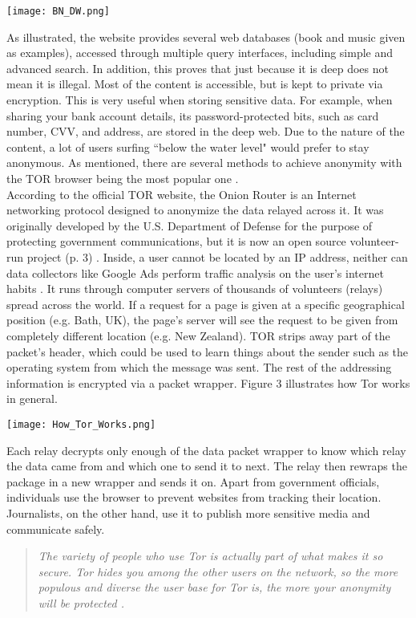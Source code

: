 \documentclass[a4paper, 12pt, titlepage]{article}
\begin{document}
\begin{center}
\texttt{[image: BN\_DW.png]}
\label{fig:BN}
\end{center}
As illustrated, the website provides several web databases (book and music given as examples), accessed through multiple query interfaces, including simple and advanced search. In addition, this proves that just because it is deep does not mean it is illegal. Most of the content is accessible, but is kept to private via encryption. This is very useful when storing sensitive data. For example, when sharing your bank account details, its password-protected bits, such as card number, CVV, and address, are stored in the deep web. Due to the nature of the content, a lot of users surfing ``below the water level" would prefer to stay anonymous. As mentioned, there are several methods to achieve anonymity with the TOR browser being the most popular one \cite{TheTORProject}. \\[6pt]
According to the official TOR website, the Onion Router is an Internet networking protocol designed to anonymize the data relayed across it. It was originally developed by the U.S. Department of Defense for the purpose of protecting government communications, but it is now an open source volunteer-run project (p. 3) \cite{InsideDW}. Inside, a user cannot be located by an IP address, neither can data collectors like Google Ads perform traffic analysis on the user's internet habits \cite{MGtoDW}. It runs through computer servers of thousands of volunteers (relays) spread across the world. If a request for a page is given at a specific geographical position (e.g. Bath, UK), the page's server will see the request to be given from completely different location (e.g. New Zealand). TOR strips away part of the packet's header, which could be used to learn things about the sender such as the operating system from which the message was sent. The rest of the addressing information is encrypted via a packet wrapper. Figure 3 illustrates how Tor works in general. \\[6pt]

\begin{center}
\texttt{[image: How\_Tor\_Works.png]}
\label{fig:Tor}
\end{center}
Each relay decrypts only enough of the data packet wrapper to know which relay the data came from and which one to send it to next. The relay then rewraps the package in a new wrapper and sends it on. Apart from government officials, individuals use the browser to prevent websites from tracking their location. Journalists, on the other hand, use it to publish more sensitive media and communicate safely. \begin{quote} \emph{The variety of people who use Tor is actually part of what makes it so secure. Tor hides you among the other users on the network, so the more populous and diverse the user base for Tor is, the more your anonymity will be protected \cite{PowerFreedom}.} \end{quote}
\end{document}
